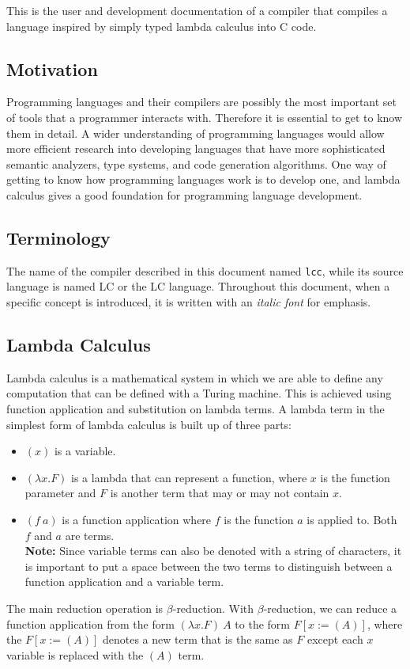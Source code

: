 \documentclass[12pt]{article}
\begin{document}
This is the user and development documentation of a compiler that compiles a
language inspired by simply typed lambda calculus into C code.

\subsection{Motivation}

Programming languages and their compilers are possibly the most important set of
tools that a programmer interacts with. Therefore it is essential to get to know
them in detail. A wider understanding of programming languages would allow more
efficient research into developing languages that have more sophisticated
semantic analyzers, type systems, and code generation algorithms. One way of
getting to know how programming languages work is to develop one, and lambda
calculus gives a good foundation for programming language development.

\subsection{Terminology}

The name of the compiler described in this document named \verb$lcc$, while its
source language is named LC or the LC language. Throughout this document, when a
specific concept is introduced, it is written with an \emph{italic font} for
emphasis.

\subsection{Lambda Calculus}

Lambda calculus is a mathematical system in which we are able to define any
computation that can be defined with a Turing machine. This is achieved using
function application and substitution on lambda terms. A lambda term in the
simplest form of lambda calculus is built up of three parts:
\begin{itemize}
    \item $(x)$ is a variable.
    \item $(\lambda x. F)$ is a lambda that can represent a function, where $x$
        is the function parameter and $F$ is another term that may or 
        may not contain $x$.
    \item $(f\:a)$ is a function application where $f$ is the function $a$ is
        applied to. Both $f$ and $a$ are terms. \\ \textbf{Note:} Since variable
        terms can also be denoted with a string of characters, it is important
        to put a space between the two terms to distinguish between a function
        application and a variable term.
\end{itemize}
The main reduction operation is $\beta$-reduction. With $\beta$-reduction, we
can reduce a function application from the form $(\lambda x. F)\:A$ to the
form $F[x := (A)]$, where the $F[x := (A)]$ denotes a new term that is the same
as $F$ except each $x$ variable is replaced with the $(A)$ term.
\end{document}

